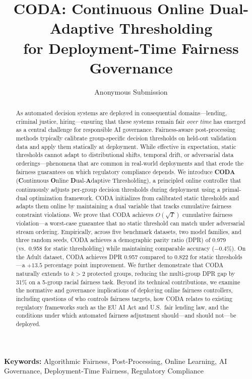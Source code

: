 \documentclass[letterpaper]{article} %
\title{CODA: Continuous Online Dual-Adaptive Thresholding\\for Deployment-Time Fairness Governance}
\author{
    Anonymous Submission
}
\theoremstyle{definition}
\begin{document}
\maketitle

\begin{abstract}
As automated decision systems are deployed in consequential domains---lending, criminal justice, hiring---ensuring that these systems remain fair \emph{over time} has emerged as a central challenge for responsible AI governance. Fairness-aware post-processing methods typically calibrate group-specific decision thresholds on held-out validation data and apply them statically at deployment. While effective in expectation, static thresholds cannot adapt to distributional shifts, temporal drift, or adversarial data orderings---phenomena that are common in real-world deployments and that erode the fairness guarantees on which regulatory compliance depends. We introduce \textbf{CODA} (\textbf{C}ontinuous \textbf{O}nline \textbf{D}ual-\textbf{A}daptive Thresholding), a principled online controller that continuously adjusts per-group decision thresholds during deployment using a primal-dual optimization framework. CODA initializes from calibrated static thresholds and adapts them online by maintaining a dual variable that tracks cumulative fairness constraint violations. We prove that CODA achieves $O(\sqrt{T})$ cumulative fairness violation---a worst-case guarantee that no static threshold can match under adversarial stream ordering. Empirically, across five benchmark datasets, two model families, and three random seeds, CODA achieves a demographic parity ratio (DPR) of 0.979 (vs.\ 0.958 for static thresholding) while maintaining comparable accuracy ($-0.4\%$). On the Adult dataset, CODA achieves DPR 0.957 compared to 0.822 for static thresholds---a $+13.5$ percentage point improvement. We further demonstrate that CODA naturally extends to $k > 2$ protected groups, reducing the multi-group DPR gap by 31\% on a 5-group racial fairness task. Beyond its technical contributions, we examine the normative and governance implications of deploying online fairness controllers, including questions of who controls fairness targets, how CODA relates to existing regulatory frameworks such as the EU AI Act and U.S.\ fair lending law, and the conditions under which automated fairness adjustment should---and should not---be deployed.
\end{abstract}

\noindent\textbf{Keywords:} Algorithmic Fairness, Post-Processing, Online Learning, AI Governance, Deployment-Time Fairness, Regulatory Compliance
\end{document}
